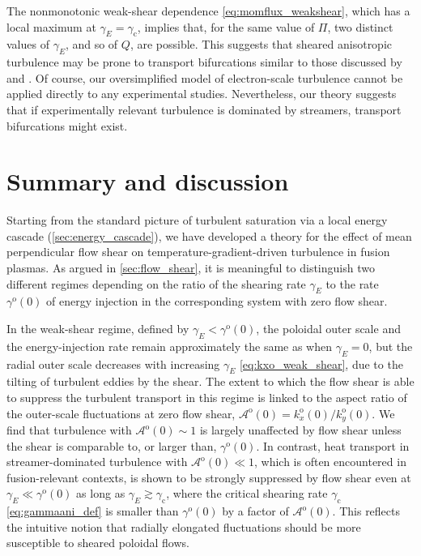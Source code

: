 \documentclass{jpp}
\newcommand{\kxoO}{k_{x}^\text{o}(0)}
\newcommand{\kyoO}{k_{y}^\text{o}(0)}
\newcommand{\gammaoO}{\gamma^\text{o}(0)}
\newcommand{\gammaani}{\gamma_{\text{c}}}
\newcommand{\gammaE}{\gamma_{E}}
\newcommand{\A}{\mathcal{A}}
\newcommand{\AoO}{\A^\text{o}(0)}
\begin{document}
The nonmonotonic weak-shear dependence \cref{eq:momflux_weakshear}, which has a local maximum at \mbox{\(\gammaE = \gammaani\)}, implies that, for the same value of \(\Pi\), two distinct values of \(\gammaE\), and so of \(Q\), are possible. This suggests that sheared anisotropic turbulence may be prone to transport bifurcations similar to those discussed by \citet{highcock10, highcock11} and \citet{parra11_shear}. Of course, our oversimplified model of electron-scale turbulence cannot be applied directly to any experimental studies. Nevertheless, our theory suggests that if experimentally relevant turbulence is dominated by streamers, transport bifurcations might exist.

\section{Summary and discussion}
\label{sec:summary}

Starting from the standard picture of turbulent saturation via a local energy cascade (\cref{sec:energy_cascade}), we have developed a theory for the effect of mean perpendicular flow shear on temperature-gradient-driven turbulence in fusion plasmas. As argued in \cref{sec:flow_shear}, it is meaningful to distinguish two different regimes depending on the ratio of the shearing rate \(\gammaE\) to the rate \(\gammaoO\) of energy injection in the corresponding system with zero flow shear. 

In the weak-shear regime, defined by \(\gammaE < \gammaoO\), the poloidal outer scale and the energy-injection rate remain approximately the same as when \(\gammaE = 0\), but the radial outer scale decreases with increasing \(\gammaE\) \cref{eq:kxo_weak_shear}, due to the tilting of turbulent eddies by the shear. The extent to which the flow shear is able to suppress the turbulent transport in this regime is linked to the aspect ratio of the outer-scale fluctuations at zero flow shear, \(\AoO = \kxoO/\kyoO\). We find that turbulence with \(\AoO \sim 1\) is largely unaffected by flow shear unless the shear is comparable to, or larger than, \(\gammaoO\). In contrast,  heat transport in streamer-dominated turbulence with \(\AoO \ll 1\), which is often encountered in fusion-relevant contexts, is shown to be strongly suppressed by flow shear even at \(\gammaE \ll \gammaoO\) as long as \(\gammaE \gtrsim \gammaani\), where the critical shearing rate \(\gammaani\) \cref{eq:gammaani_def} is smaller than \(\gammaoO\) by a factor of \(\AoO\). This reflects the intuitive notion that radially elongated fluctuations should be more susceptible to sheared poloidal flows. 
\end{document}
